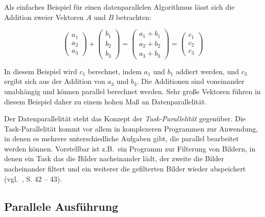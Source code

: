 Als einfaches Beispiel für einen datenparallelen Algorithmus lässt sich die Addition zweier Vektoren $A$ und $B$
betrachten:

\begin{equation*}
    \left(
        \begin{array}{c}
            a_1\\
            a_2\\
            a_3
        \end{array}
    \right)
    +
    \left(
        \begin{array}{c}
            b_1\\
            b_2\\
            b_3
        \end{array}
    \right)
    =
    \left(
        \begin{array}{c}
            a_1 + b_1 \\
            a_2 + b_2 \\
            a_3 + b_3
        \end{array}
    \right)
    =
    \left(
        \begin{array}{c}
            c_1 \\
            c_2 \\
            c_3
        \end{array}
    \right)
\end{equation*}

In diesem Beispiel wird $c_1$ berechnet, indem $a_1$ und $b_1$ addiert werden, und $c_3$ ergibt sich aus der Addition
von $a_3$ und $b_3$. Die Additionen sind voneinander unabhängig und können parallel berechnet werden. Sehr große
Vektoren führen in diesem Beispiel daher zu einem hohen Maß an Datenparallelität.

Der Datenparallelität steht das Konzept der \textit{Task-Parallelität} gegenüber. Die Task-Parallelität kommt vor allem
in komplexeren Programmen zur Anwendung, in denen es mehrere unterschiedliche Aufgaben gibt, die parallel bearbeitet
werden können. Vorstellbar ist z.B.\ ein Programm zur Filterung von Bildern, in denen ein Task das die Bilder
nacheinander lädt, der zweite die Bilder nacheinander filtert und ein weiterer die gefilterten Bilder wieder
abspeichert (vgl.~\cite{kirkhwu}, S. 42 -- 43).

\subsection{Parallele Ausführung}

